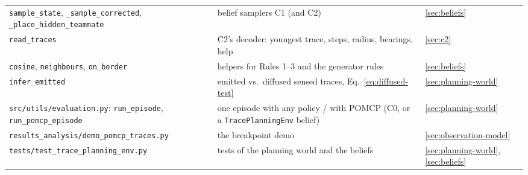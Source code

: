 \documentclass[11pt,a4paper]{article}
\newcommand{\file}{\nolinkurl}  %
\newcommand{\code}[1]{\texttt{#1}}
\theoremstyle{remark}
\begin{document}
\begin{center}
\begin{tabular}{p{5.2cm}p{7.3cm}l}
\quad\code{sample\_state}, \code{\_sample\_corrected}, \code{\_place\_hidden\_teammate} & belief samplers C1 (and C2)
  & \ref{sec:beliefs} \\
\quad\code{read\_traces} & C2's decoder: youngest trace, steps, radius, bearings, help & \ref{sec:c2} \\
\quad\code{cosine}, \code{neighbours}, \code{on\_border} & helpers for Rules 1--3 and the generator rules &
  \ref{sec:beliefs} \\
\quad\code{infer\_emitted} & emitted vs.\ diffused sensed traces, Eq.~\eqref{eq:diffused-test} & \ref{sec:planning-world} \\
\file{src/utils/evaluation.py}: \code{run\_episode}, \code{run\_pomcp\_episode} & one episode with any policy / with POMCP
  (C0, or a \code{TracePlanningEnv} belief) & \ref{sec:planning-world} \\
\file{results_analysis/demo_pomcp_traces.py} & the breakpoint demo & \ref{sec:observation-model} \\
\file{tests/test_trace_planning_env.py} & tests of the planning world and the beliefs & \ref{sec:planning-world}, \ref{sec:beliefs} \\
\bottomrule
\end{tabular}
\end{center}
\end{document}

